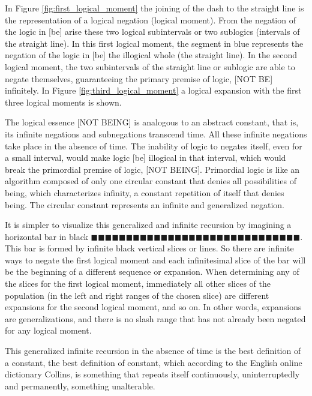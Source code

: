 In Figure \ref{fig:first_logical_moment} the joining of the dash to the straight line is the representation of a logical negation (logical moment). From the negation of the logic in [be] arise these two logical subintervals or two sublogics (intervals of the straight line). In this first logical moment, the segment in blue represents the negation of the logic in [be] the illogical whole (the straight line). In the second logical moment, the two subintervals of the straight line or sublogic are able to negate themselves, guaranteeing the primary premise of logic, [NOT BE] infinitely. In Figure \ref{fig:third_logical_moment} a logical expansion with the first three logical moments is shown.

The logical essence [NOT BEING] is analogous to an abstract constant, that is, its infinite negations and subnegations transcend time. All these infinite negations take place in the absence of time. The inability of logic to negates itself, even for a small interval, would make logic [be] illogical in that interval, which would break the primordial premise of logic, [NOT BEING]. Primordial logic is like an algorithm composed of only one circular constant that denies all possibilities of being, which characterizes infinity, a constant repetition of itself that denies being. The circular constant represents an infinite and generalized negation.

It is simpler to visualize this generalized and infinite recursion by imagining a horizontal bar in black $\!\blacksquare\!\blacksquare\!\blacksquare\!\blacksquare\!\blacksquare\!\blacksquare\!\blacksquare\!\blacksquare\!\blacksquare\!\blacksquare\!\blacksquare\!\blacksquare\!\blacksquare\!\blacksquare\!\blacksquare\!\blacksquare\!\blacksquare\!\blacksquare\!\blacksquare\!\blacksquare\!\blacksquare\!\blacksquare\!\blacksquare\!\blacksquare\!\blacksquare\!\blacksquare\!\blacksquare\!\blacksquare\!\blacksquare\!\blacksquare$. This bar is formed by infinite black vertical slices or lines. So there are infinite ways to negate the first logical moment and each infinitesimal slice of the bar will be the beginning of a different sequence or expansion. When determining any of the slices for the first logical moment, immediately all other slices of the population (in the left and right ranges of the chosen slice) are different expansions for the second logical moment, and so on. In other words, expansions are generalizations, and there is no slash range that has not already been negated for any logical moment.

This generalized infinite recursion in the absence of time is the best definition of a constant, the best definition of constant, which according to the English online dictionary Collins\cite{dic_constant}, is something that repeats itself continuously, uninterruptedly and permanently, something unalterable.

